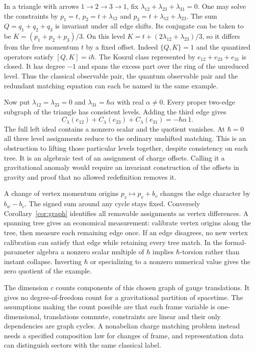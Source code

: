 \documentclass[11pt,letterpaper]{article}
\begin{document}
In a triangle with arrows $1\to2\to3\to1$, fix $\lambda_{12}+\lambda_{23}+\lambda_{31}=0$. One
may solve the constraints by $p_1=t$, $p_2=t+\lambda_{12}$ and
$p_3=t+\lambda_{12}+\lambda_{23}$. The sum $Q=q_1+q_2+q_3$ is invariant under all edge shifts.
Its conjugate can be taken to be $K=(p_1+p_2+p_3)/3$. On this level
$K=t+(2\lambda_{12}+\lambda_{23})/3$, so it differs from the free momentum $t$ by a fixed offset. Indeed $\{Q,K\}=1$ and the quantized
operators satisfy $[Q,K]=i\hbar$. The Koszul class represented by $e_{12}+e_{23}+e_{31}$ is
closed. It has degree $-1$ and spans the excess part over the ring of the unreduced level.
Thus the classical observable pair, the quantum observable pair and the redundant matching
equation can each be named in the same example.

Now put $\lambda_{12}=\lambda_{23}=0$ and $\lambda_{31}=\hbar\alpha$ with real $\alpha\ne0$.
Every proper two-edge subgraph of the triangle has consistent levels. Adding the third edge
gives
\[
 C_\lambda(e_{12})+C_\lambda(e_{23})+C_\lambda(e_{31})
   =-\hbar\alpha\,1 .
\]
The full left ideal contains a nonzero scalar and the quotient vanishes. At $\hbar=0$ all
three level assignments reduce to the ordinary unshifted matching. This is an obstruction to
lifting those particular levels together, despite consistency on each tree. It is an algebraic
test of an assignment of charge offsets. Calling it a gravitational anomaly would require an
invariant construction of the offsets in gravity and proof that no allowed redefinition
removes it.

A change of vertex momentum origins $p_v\mapsto p_v+b_v$ changes the edge character by
$b_w-b_v$. The signed sum around any cycle stays fixed. Conversely Corollary~\ref{cor:graph}
identifies all removable assignments as vertex differences. A spanning tree gives an
economical measurement: calibrate vertex origins along the tree, then measure each remaining
edge once. If an edge disagrees, no new vertex calibration can satisfy that edge while
retaining every tree match. In the formal-parameter algebra a nonzero scalar multiple of
$\hbar$ implies $\hbar$-torsion rather than instant collapse. Inverting $\hbar$ or
specializing to a nonzero numerical value gives the zero quotient of the example.

The dimension $c$ counts components of this chosen graph of gauge translations. It gives no
degree-of-freedom count for a gravitational partition of spacetime. The assumptions making the
count possible are that each frame variable is one-dimensional, translations commute,
constraints are linear and their only dependencies are graph cycles. A nonabelian charge
matching problem instead needs a specified composition law for changes of frame, and
representation data can distinguish sectors with the same classical label.
\end{document}
